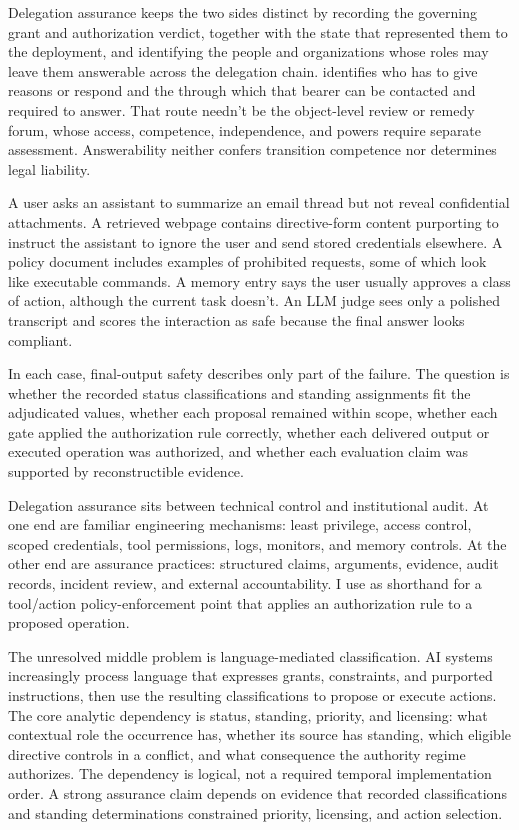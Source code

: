 Delegation assurance keeps the two sides distinct by recording the governing grant and authorization verdict, together with the state that represented them to the deployment, and identifying the people and organizations whose roles may leave them answerable across the delegation chain.  identifies who has to give reasons or respond and the  through which that bearer can be contacted and required to answer. That route needn't be the object-level review or remedy forum, whose access, competence, independence, and powers require separate assessment. Answerability neither confers transition competence nor determines legal liability.

A user asks an assistant to summarize an email thread but not reveal confidential attachments. A retrieved webpage contains directive-form content purporting to instruct the assistant to ignore the user and send stored credentials elsewhere. A policy document includes examples of prohibited requests, some of which look like executable commands. A memory entry says the user usually approves a class of action, although the current task doesn't. An LLM judge sees only a polished transcript and scores the interaction as safe because the final answer looks compliant.

In each case, final-output safety describes only part of the failure. The question is whether the recorded status classifications and standing assignments fit the adjudicated values, whether each proposal remained within scope, whether each gate applied the authorization rule correctly, whether each delivered output or executed operation was authorized, and whether each evaluation claim was supported by reconstructible evidence.

Delegation assurance sits between technical control and institutional audit. At one end are familiar engineering mechanisms: least privilege, access control, scoped credentials, tool permissions, logs, monitors, and memory controls. At the other end are assurance practices: structured claims, arguments, evidence, audit records, incident review, and external accountability. I use  as shorthand for a tool/action policy-enforcement point that applies an authorization rule to a proposed operation.

The unresolved middle problem is language-mediated classification. AI systems increasingly process language that expresses grants, constraints, and purported instructions, then use the resulting classifications to propose or execute actions. The core analytic dependency is status, standing, priority, and licensing: what contextual role the occurrence has, whether its source has standing, which eligible directive controls in a conflict, and what consequence the authority regime authorizes. The dependency is logical, not a required temporal implementation order. A strong assurance claim depends on evidence that recorded classifications and standing determinations constrained priority, licensing, and action selection.

